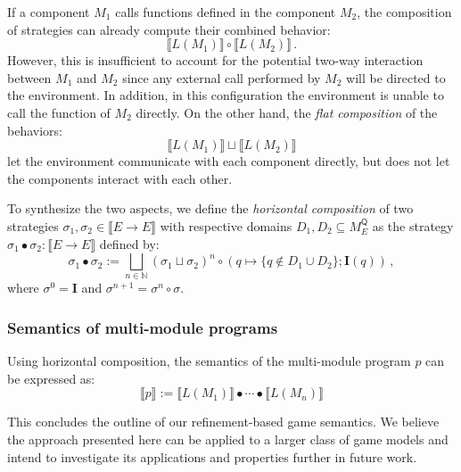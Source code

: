 \documentclass[format=sigplan,authordraft]{acmart}
\newcommand{\kw}[1]{\ensuremath{\mathsf{#1}}}
\begin{document}
If a component $M_1$ calls functions defined
in the component $M_2$,
the composition of strategies
can already compute their combined behavior:
\[
    \llbracket L(M_1) \rrbracket \circ
    \llbracket L(M_2) \rrbracket \,.
\]
However,
this is insufficient to account for
the potential two-way interaction between $M_1$ and $M_2$
since any external call performed by $M_2$
will be directed to the environment.
In addition,
in this configuration the environment
is unable to call the function of $M_2$ directly.
On the other hand,
the \emph{flat composition} of the behaviors:
\[
    \llbracket L(M_1) \rrbracket \sqcup
    \llbracket L(M_2) \rrbracket
\]
let the environment communicate with each component directly,
but does not let the components interact with each other.

To synthesize the two aspects,
we define the \emph{horizontal composition}
of two strategies $\sigma_1, \sigma_2 \in \llbracket E \rightarrow E \rrbracket$
with respective domains $D_1, D_2 \subseteq M_E^\kw{Q}$
as the strategy $\sigma_1 \bullet \sigma_2 : \llbracket E \rightarrow E
\rrbracket$ defined by:
\[
    \sigma_1 \bullet \sigma_2 :=
      \bigsqcup_{n \in \mathbb{N}} (\sigma_1 \sqcup \sigma_2)^n \circ
        (q \mapsto \{ q \notin D_1 \cup D_2 \} ; \mathbf{I}(q))
 \,,
\]
where $\sigma^0 = \mathbf{I}$ and $\sigma^{n+1} = \sigma^n \circ
\sigma$.

\subsubsection{Semantics of multi-module programs}

Using horizontal composition,
the semantics of the multi-module program $p$
can be expressed as:
\[
    \llbracket p \rrbracket :=
    \llbracket L(M_1) \rrbracket \bullet \cdots \bullet
    \llbracket L(M_n) \rrbracket
\]

This concludes the outline of our refinement-based game semantics.
We believe the approach presented here can be applied to a larger class
of game models and intend to investigate its applications
and properties further in future work.

\end{document}
